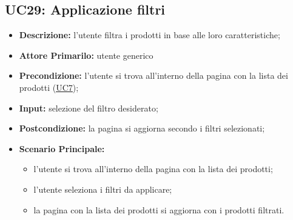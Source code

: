 \subsection{UC29: Applicazione filtri}
\label{sec:UC29}
\begin{itemize}
    \item \textbf{Descrizione:} l'utente filtra i prodotti in base alle loro caratteristiche;
    \item \textbf{Attore Primarilo:} utente generico
    \item \textbf{Precondizione:} l'utente si trova all'interno della pagina con la lista dei prodotti (\hyperref[sec:UC7]{\underline{UC7}});
    \item \textbf{Input:} selezione del filtro desiderato;
    \item \textbf{Postcondizione:} la pagina si aggiorna secondo i filtri selezionati;
    \item \textbf{Scenario Principale:}
          \begin{itemize}
              \item l'utente si trova all'interno della pagina con la lista dei prodotti;
              \item l'utente seleziona i filtri da applicare;
              \item la pagina con la lista dei prodotti si aggiorna con i prodotti filtrati.
          \end{itemize}
\end{itemize}